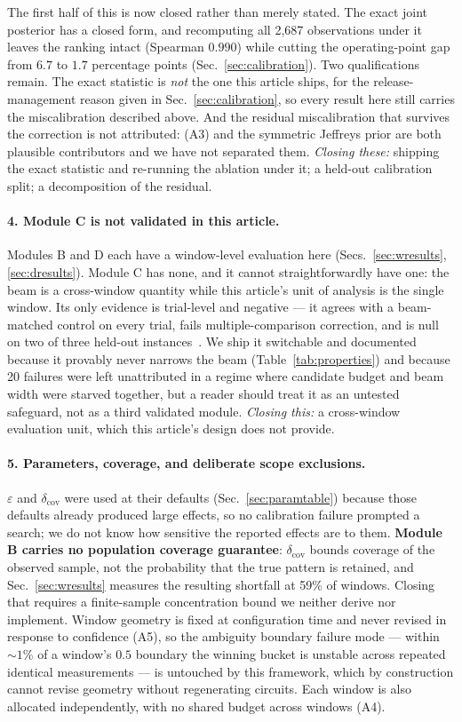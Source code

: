 \documentclass[final,5p,times,longtitle]{elsarticle}
\newcommand{\dcov}{\delta_{\mathrm{cov}}}
\begin{document}
The first half of this is now closed rather than merely stated. The exact
joint posterior has a closed form, and recomputing all 2{,}687 observations
under it leaves the ranking intact (Spearman $0.990$) while cutting the
operating-point gap from $6.7$ to $1.7$ percentage points
(Sec.~\ref{sec:calibration}). Two qualifications remain. The exact
statistic is \emph{not} the one this article ships, for the release-
management reason given in Sec.~\ref{sec:calibration}, so every result here
still carries the miscalibration described above. And the residual
miscalibration that survives the correction is not attributed: (A3) and the
symmetric Jeffreys prior are both plausible contributors and we have not
separated them. \emph{Closing these:} shipping the exact statistic and
re-running the ablation under it; a held-out calibration split; a
decomposition of the residual.

\paragraph{4. Module C is not validated in this article.}
Modules B and D each have a window-level evaluation here
(Secs.~\ref{sec:wresults}, \ref{sec:dresults}). Module C has none, and it
cannot straightforwardly have one: the beam is a cross-window quantity
while this article's unit of analysis is the single window. Its only
evidence is trial-level and negative --- it agrees with a beam-matched
control on every trial, fails multiple-comparison correction, and is null
on two of three held-out instances~\cite{companion}. We ship it switchable
and documented because it provably never narrows the beam
(Table~\ref{tab:properties}) and because 20 failures were left unattributed
in a regime where candidate budget and beam width were starved together, but
a reader should treat
it as an untested safeguard, not as a third validated module.
\emph{Closing this:} a cross-window evaluation unit, which this article's
design does not provide.

\paragraph{5. Parameters, coverage, and deliberate scope exclusions.}
$\varepsilon$ and $\dcov$ were used at their defaults
(Sec.~\ref{sec:paramtable}) because those defaults already produced large
effects, so no calibration failure prompted a search; we do not know how
sensitive the reported effects are to them. \textbf{Module B carries no
population coverage guarantee}: $\dcov$ bounds coverage of the observed
sample, not the probability that the true pattern is retained, and
Sec.~\ref{sec:wresults} measures the resulting shortfall at 59\% of
windows. Closing that requires a finite-sample concentration bound we
neither derive nor implement. Window geometry is fixed at configuration
time and never revised in response to confidence (A5), so the ambiguity
boundary failure mode --- within ${\sim}1\%$ of a window's $0.5$ boundary
the winning bucket is unstable across repeated identical measurements ---
is untouched by this framework, which by construction cannot revise
geometry without regenerating circuits. Each window is also allocated
independently, with no shared budget across windows (A4).
\end{document}
